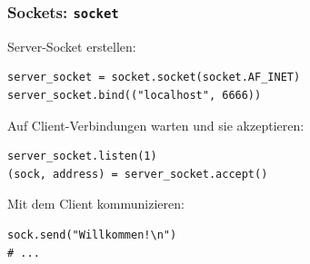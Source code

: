 \begin{frame}[fragile]
\frametitle{Sockets: \texttt{socket}}
Server-Socket erstellen:
\begin{lstlisting}[style=Python]
server_socket = socket.socket(socket.AF_INET)
server_socket.bind(("localhost", 6666))
\end{lstlisting}
\vspace*{2mm}
Auf Client-Verbindungen warten und sie akzeptieren:
\begin{lstlisting}[style=Python]
server_socket.listen(1)
(sock, address) = server_socket.accept()
\end{lstlisting}
\vspace*{2mm}
Mit dem Client kommunizieren:
\begin{lstlisting}[style=Python]
sock.send("Willkommen!\n")
# ...
\end{lstlisting}
\end{frame}




